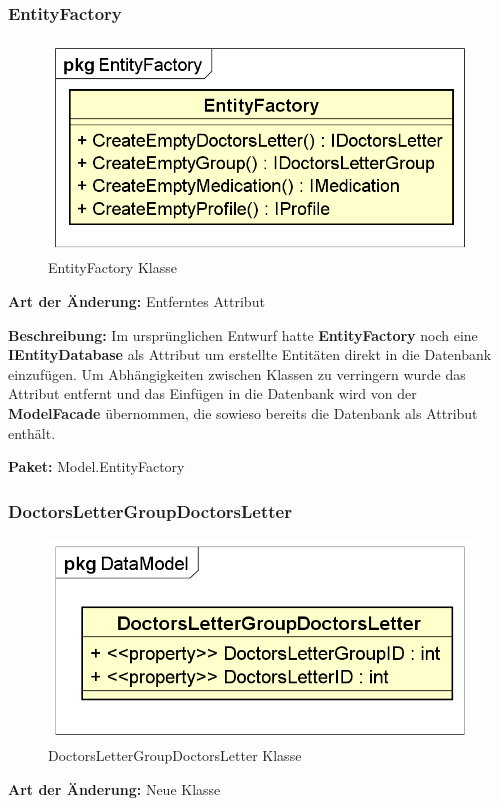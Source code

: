 \documentclass[a4paper]{scrreprt}
\begin{document}
\subsubsection{EntityFactory}
\begin{figure}[H]
\centering
\includegraphics[width=0.75\textheight]{graphics/Klassendiagramme/Model/EntityFactory.png}
\caption{EntityFactory Klasse}
\end{figure}
\textbf{Art der Änderung:} Entferntes Attribut

\textbf{Beschreibung:} Im ursprünglichen Entwurf hatte \textbf{EntityFactory} noch eine \textbf{IEntityDatabase} als Attribut um erstellte Entitäten direkt in die Datenbank einzufügen. Um Abhängigkeiten zwischen Klassen zu verringern wurde das Attribut entfernt und das Einfügen in die Datenbank wird von der \textbf{ModelFacade} übernommen, die sowieso bereits die Datenbank als Attribut enthält.

\textbf{Paket:} Model.EntityFactory

\subsubsection{DoctorsLetterGroupDoctorsLetter}
\begin{figure}[H]
\centering
\includegraphics[width=0.75\textheight]{graphics/Klassendiagramme/Model/DoctorsLetterGroupDoctorsLetter.png}
\caption{DoctorsLetterGroupDoctorsLetter Klasse}
\end{figure}
\textbf{Art der Änderung:} Neue Klasse
\end{document}
